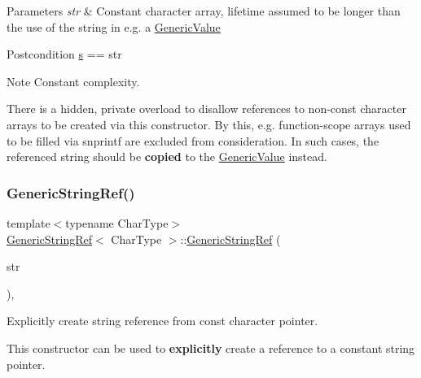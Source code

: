 \begin{DoxyParams}{Parameters}
{\em str} & Constant character array, lifetime assumed to be longer than the use of the string in e.\+g. a \hyperlink{class_generic_value}{Generic\+Value}\\
\hline
\end{DoxyParams}
\begin{DoxyPostcond}{Postcondition}
\hyperlink{struct_generic_string_ref_ac555994afd329bc9bc1780acf2f9d9be}{s} == str
\end{DoxyPostcond}
\begin{DoxyNote}{Note}
Constant complexity. 

There is a hidden, private overload to disallow references to non-\/const character arrays to be created via this constructor. By this, e.\+g. function-\/scope arrays used to be filled via {\ttfamily snprintf} are excluded from consideration. In such cases, the referenced string should be {\bfseries copied} to the \hyperlink{class_generic_value}{Generic\+Value} instead. 
\end{DoxyNote}
\mbox{\label{struct_generic_string_ref_a9e80d81d5ad49cf0fb4128ace8c548d9}} 
\subsubsection{\texorpdfstring{Generic\+String\+Ref()}{GenericStringRef()}\hspace{0.1cm}{\footnotesize\ttfamily [2/3]}}
{\footnotesize\ttfamily template$<$typename Char\+Type$>$ \\
\hyperlink{struct_generic_string_ref}{Generic\+String\+Ref}$<$ Char\+Type $>$\+::\hyperlink{struct_generic_string_ref}{Generic\+String\+Ref} (\begin{DoxyParamCaption}\item[{const Char\+Type $\ast$}]{str }\end{DoxyParamCaption})\hspace{0.3cm}{\ttfamily [inline]}, {\ttfamily [explicit]}}



Explicitly create string reference from {\ttfamily const} character pointer. 

This constructor can be used to {\bfseries explicitly} create a reference to a constant string pointer.

